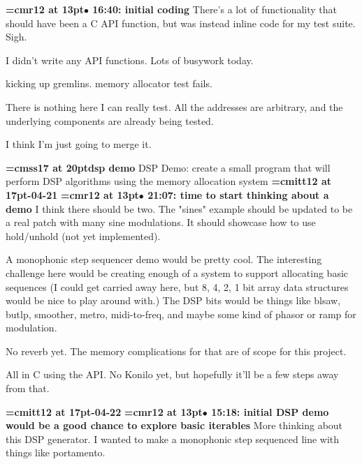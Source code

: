 {\smallskip\noindent\bf\font\titlefont=cmr12 at 13pt\titlefont $\bullet$ 16:40: initial coding}\smallskip
There's a lot of functionality that should have been a C API function, but was instead inline code for my test suite. Sigh.
\par

I didn't write any API functions. Lots of busywork today.
\par

kicking up gremlins. memory allocator test fails.
\par

There is nothing here I can really test. All the addresses are arbitrary, and the underlying components are already being tested.
\par

I think I'm just going to merge it.
\par

{\medskip\noindent\bf\font\titlefont=cmss17 at 20pt\titlefont dsp demo}\medskip
DSP Demo: create a small program that will perform DSP algorithms
using the memory allocation system
{\medskip\noindent\bf\font\titlefont=cmitt12 at 17pt-04-21}\medskip
{\smallskip\noindent\bf\font\titlefont=cmr12 at 13pt\titlefont $\bullet$ 21:07: time to start thinking about a demo}\smallskip
I think there should be two. The "sines" example should be updated to be a real patch with many sine modulations. It should showcase how to use hold/unhold (not yet implemented).
\par

A monophonic step sequencer demo would be pretty cool. The interesting challenge here would be creating enough of a system to support allocating basic sequences (I could get carried away here, but 8, 4, 2, 1 bit array data structures would be nice to play around with.) The DSP bits would be things like blsaw, butlp, smoother, metro, midi-to-freq, and maybe some kind of phasor or ramp for modulation.
\par

No reverb yet. The memory complications for that are of scope for this project.
\par

All in C using the API. No Konilo yet, but hopefully it'll be a few steps away from that.
\par

{\medskip\noindent\bf\font\titlefont=cmitt12 at 17pt-04-22}\medskip
{\smallskip\noindent\bf\font\titlefont=cmr12 at 13pt\titlefont $\bullet$ 15:18: initial DSP demo would be a good chance to explore basic iterables}\smallskip
More thinking about this DSP generator. I wanted to make a monophonic step sequenced line with things like portamento.
\par

